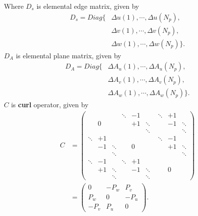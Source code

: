 Where $D_{s}$ is elemental edge matrix, given by
\begin{align*}
D_{s}=
Diag\{&\Delta u(1),\cdots,\Delta u(N_{p}),\nonumber\\
			&\Delta v(1),\cdots,\Delta v(N_{p}),\nonumber\\
			&\Delta w(1),\cdots,\Delta w(N_{p})
\} \text{.}
\end{align*}
$D_{A}$ is elemental plane matrix, given by
\begin{align*}
D_{A}=
Diag\{&\Delta A_{u}(1),\cdots,\Delta A_{u}(N_{p}),\nonumber\\
			&\Delta A_{v}(1),\cdots,\Delta A_{v}(N_{p}),\nonumber\\
			&\Delta A_{w}(1),\cdots,\Delta A_{w}(N_{p})
\} \text{.}
\end{align*}
$C$ is \textbf{curl} operator, given by
\begin{align*}
C&=\left(
	\begin{array}{ccc|ccc|ccc}
	&&&\ddots &-1& &\ddots &+1&\\	
	&0&&&+1&\ddots&&-1&\ddots\\
	&&&&&\ddots&&&\ddots\\	
	\hline
	\ddots &+1&&&&&\ddots &-1&\\
	&-1 &\ddots&&0&\quad&&+1&\ddots\\
	&&\ddots&&&&&&\ddots\\
	\hline
	\ddots &-1&&\ddots &+1&&&&\\
	&+1 &\ddots&&-1&\ddots&&0&\\
	&&\ddots&&&\ddots&&&
	\end{array}\right)\\
	&=
	\begin{pmatrix}
	0&-P_{w}&P_{v}\\
	P_{w}&0&-P_{u}\\
	-P_{v}&P_{u}&0
	\end{pmatrix} \text{.}
\end{align*}
